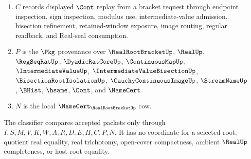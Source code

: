 \begin{definition}
\begin{enumerate}
\item $C$ records displayed $\Cont$ replay from a bracket request through endpoint inspection, sign inspection, modulus use, intermediate-value admission, bisection refinement, retained-window exposure, image routing, regular readback, and Real-seal consumption.
\item $P$ is the $\Pkg$ provenance over $\RealRootBracketUp$, $\RealUp$, $\RegSeqRatUp$, $\DyadicRatCoreUp$, $\ContinuousMapUp$, $\IntermediateValueUp$, $\IntermediateValueBisectionUp$, $\BisectionRootIsolationUp$, $\CauchyContinuousImageUp$, $\StreamNameUp$, $\BHist$, $\hsame$, $\Cont$, and $\NameCert$.
\item $N$ is the local $\NameCert_{\RealRootBracketUp}$ row.
\end{enumerate}
The classifier compares accepted packets only through $I,S,M,V,K,W,A,R,D,E,H,C,P,N$. It has no coordinate for a selected root, quotient real equality, real trichotomy, open-cover compactness, ambient $\RealUp$ completeness, or host root equality.
\end{definition}

